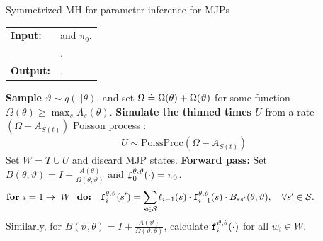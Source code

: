 \begin{algorithm} %
   \caption{Symmetrized MH for parameter inference for MJPs }
   \label{alg:MH_improved}
  \begin{tabular}{l l}
   \textbf{Input:  } & \text{The observations $X$,}
                      \text{the MJP path $S(t) = (S, T)$, parameters $\theta$} and $\pi_0$.\\ 
                     & \text{A  Metropolis-Hasting proposal $q(\cdot | \theta)$}.\\
   \textbf{Output:  }& \text{A new MJP trajectory $S'(t) = (S', T')$, 
                            new MJP parameters $\theta'$}.\\
   \hline
   \end{tabular}
   \begin{algorithmic}[1]
     \State \textbf{Sample $\vartheta \sim q(\cdot| \theta)$}, and 
      set %
	$\Omega \doteq \Omega(\theta) + \Omega(\vartheta)$ for some function 
    $\Omega(\theta) \ge \max_s A_s(\theta)$.
      \State \textbf{ Simulate the thinned times $U$ } from a rate-$(\Omega-A_{S(t)})$ Poisson process : 
\begin{align*}
  U \sim \text{PoissProc}(\Omega - A_{S(t)}) 
\end{align*}
    \State Set $W = T \cup U$ and discard MJP states.
        \State \textbf{Forward pass:} Set $B(\theta,\vartheta) = I + \frac{A(\theta)}{\Omega(\theta, \vartheta)}$ and $\mathtt{f}^{\theta, \vartheta}_0(\cdot) = \pi_0$.
    $$\textbf{for } i=1\rightarrow |W|\textbf{ do:} \quad \mathtt{f}^{\theta,\vartheta}_i(s') = \sum_{s \in {\mathcal S}} \ell_{i-1}(s) \cdot \mathtt{f}^{\theta,\vartheta}_{i-1}(s)\cdot B_{ss'}(\theta,\vartheta), \quad \forall s' \in {\mathcal S}.\qquad\qquad\quad $$
    Similarly, for $B(\vartheta,\theta) = I + \frac{A(\vartheta)}{\Omega(\vartheta, \theta)}$, calculate $\mathtt{f}^{\vartheta,\theta}_i(\cdot)$ for all $w_i \in W$.

\end{algorithmic}
\end{algorithm}
